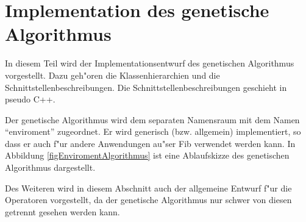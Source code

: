 %
%
%
%

\graphicspath{{./material_enviroment_implementation/}}
\graphicspath{{./material_enviroment_implementation/}{../material_enviroment_implementation}}


\newpage
\part{Implementation des genetische Algorithmus}
\label{partImplementationAlgorithmus}

In diesem Teil wird der Implementationsentwurf des genetischen Algorithmus vorgestellt. Dazu geh"oren die Klassenhierarchien und die Schnittstellenbeschreibungen. Die Schnittstellenbeschreibungen geschieht in pseudo C++.

Der genetische Algorithmus wird dem separaten Namensraum mit dem Namen ``enviroment'' zugeordnet. Er wird generisch (bzw. allgemein) implementiert, so dass er auch f"ur andere Anwendungen au"ser Fib verwendet werden kann. In Abbildung \ref{figEnviromentAlgorithmus} ist eine Ablaufskizze des genetischen Algorithmus dargestellt.

Des Weiteren wird in diesem Abschnitt auch der allgemeine Entwurf f"ur die Operatoren vorgestellt, da der genetische Algorithmus nur schwer von diesen getrennt gesehen werden kann.


